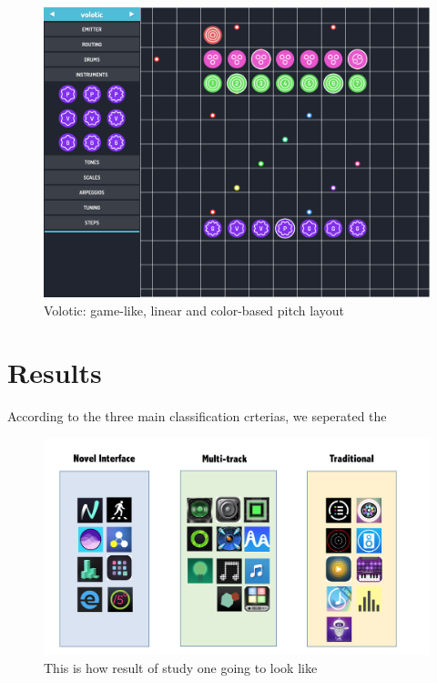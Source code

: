 \bigskip
\begin{figure}[h]
  \includegraphics[width=12 cm]{images/Volotic.PNG}
  \centering
  \caption{Volotic: game-like, linear and color-based pitch layout}
  \label{fig: Volotic}
\end{figure}
\bigskip

\section{Results}

According to the three main classification crterias, we seperated the 

\label{sec: result}
\bigskip
\begin{figure}[h]
  \includegraphics[width=\textwidth]{images/Template.png}
  \centering
  \caption{This is how result of study one going to look like}
  \label{fig: Results}
\end{figure}
\bigskip

